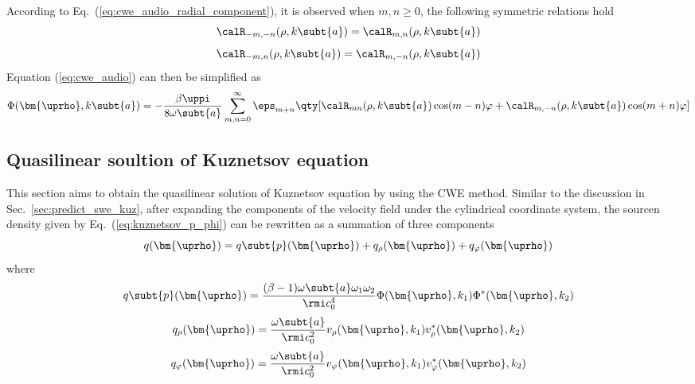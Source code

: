 According to Eq.~(\ref{eq:cwe_audio_radial_component}), it is observed when $m, n\geq 0$, the following symmetric relations hold 
\begin{equation}
    \calR_{-m,-n} (\rho, k\subt{a})
    =
    \calR_{m,n}(\rho,k\subt{a})
    \label{eq:18832904}
\end{equation}
\begin{equation}
    \calR_{-m,n} (\rho, k\subt{a})
    =
    \calR_{m,-n}(\rho,k\subt{a})
    \label{eq:1228832904}
\end{equation}
Equation (\ref{eq:cwe_audio}) can then be simplified as
\begin{equation}
    \Phi(\bm{\uprho},k\subt{a})
    =
    -\frac{\beta\uppi }{8\omega\subt{a} }
    \sum_{m,n=0}^\infty
    \eps_{m+n}\qty[\calR_{mn}(\rho,k\subt{a})
    \cos(m-n)\varphi + \calR_{m,-n}(\rho,k\subt{a}) \cos(m+n)\varphi]
    \label{eq:23890199222}
\end{equation}



\subsection{Quasilinear soultion of Kuznetsov equation}
This section aims to obtain the quasilinear solution of Kuznetsov equation by using the CWE method.
Similar to the discussion in Sec.~\ref{sec:predict_swe_kuz}, after expanding the components of the velocity field under the cylindrical coordinate system, the sourcen density given by Eq.~(\ref{eq:kuznetsov_p_phi}) can be rewritten as a summation of three components 
\begin{equation}
    q(\bm{\uprho})
    =
    q\subt{p}(\bm{\uprho})
    +
    q_\rho(\bm{\uprho})
    + 
    q_\varphi(\bm{\uprho})
    \label{eq:123012039}
\end{equation}
where
\begin{equation}
    q\subt{p}(\bm{\uprho})
    = 
    \frac{(\beta-1)\omega\subt{a}\omega_1\omega_2}{ \rmi c_0^4}
    \Phi(\bm{\uprho},k_1)\Phi^*(\bm{\uprho},k_2)
    \label{eq:21301203124218}
\end{equation}
\begin{equation}
    q_\rho(\bm{\uprho})
    =
    \frac{\omega\subt{a} }{\rmi c_0^2}
    v_\rho(\bm{\uprho},k_1)
    v_\rho^*(\bm{\uprho},k_2)
    \label{eq:1203102344}
\end{equation}
\begin{equation}
    q_\varphi(\bm{\uprho})
    =
    \frac{\omega\subt{a}}{ \rmi c_0^2}
    v_\varphi(\bm{\uprho},k_1)
    v_\varphi^*(\bm{\uprho},k_2)
    \label{eq:2101111}
\end{equation}

